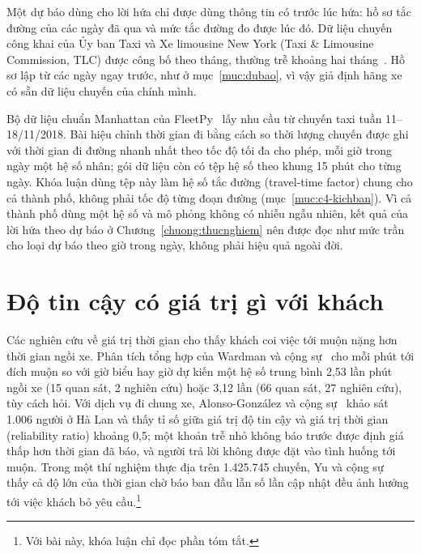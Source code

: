 Một dự báo dùng cho lời hứa chỉ được dùng thông tin có trước lúc hứa: hồ sơ tắc đường của các ngày đã qua và mức tắc
đường đo được lúc đó. Dữ liệu chuyến công khai của Ủy ban Taxi và Xe limousine New York (Taxi \& Limousine
Commission, TLC) được công bố theo tháng, thường trễ khoảng hai tháng~\cite{tlc}. Hồ sơ lập từ các ngày ngay trước, như
ở mục~\ref{muc:dubao}, vì vậy giả định hãng xe có sẵn dữ liệu chuyến của chính mình.

Bộ dữ liệu chuẩn Manhattan của FleetPy~\cite{engelhardt2026} lấy nhu cầu từ chuyến taxi tuần 11--18/11/2018. Bài hiệu
chỉnh thời gian đi bằng cách so thời lượng chuyến được ghi với thời gian đi đường nhanh nhất theo tốc độ tối đa cho
phép, mỗi giờ trong ngày một hệ số nhân; gói dữ liệu còn có tệp hệ số theo khung 15 phút cho từng ngày. Khóa luận dùng
tệp này làm hệ số tắc đường (travel-time factor) chung cho cả thành phố, không phải tốc độ từng đoạn đường
(mục~\ref{muc:c4-kichban}). Vì cả thành phố dùng một hệ số và mô phỏng không có nhiễu ngẫu nhiên, kết quả của lời hứa
theo dự báo ở Chương~\ref{chuong:thucnghiem} nên được đọc như mức trần cho loại dự báo theo giờ trong ngày, không phải
hiệu quả ngoài đời.

\section{Độ tin cậy có giá trị gì với khách}
\label{muc:c2-giatri}

Các nghiên cứu về giá trị thời gian cho thấy khách coi việc tới muộn nặng hơn thời gian ngồi xe. Phân tích tổng hợp
của Wardman và cộng sự~\cite{wardman2026} cho mỗi phút tới đích muộn so với giờ biểu hay giờ dự kiến một hệ số trung
bình 2,53 lần phút ngồi xe (15 quan sát, 2 nghiên cứu) hoặc 3,12 lần (66 quan sát, 27 nghiên cứu), tùy cách hỏi. Với
dịch vụ đi chung xe, Alonso-González và cộng sự~\cite{alonsogonzalez2020} khảo sát 1.006 người ở Hà Lan và thấy tỉ số
giữa giá trị độ tin cậy và giá trị thời gian (reliability ratio) khoảng 0,5; một khoản trễ nhỏ không báo trước được
định giá thấp hơn thời gian đã báo, và người trả lời không được đặt vào tình huống tới muộn. Trong một thí nghiệm thực
địa trên 1.425.745 chuyến, Yu và cộng sự~\cite{yu2022} thấy cả độ lớn của thời gian chờ báo ban đầu lẫn số lần cập
nhật đều ảnh hưởng tới việc khách bỏ yêu cầu.\footnote{Với bài này, khóa luận chỉ đọc phần tóm tắt.}

